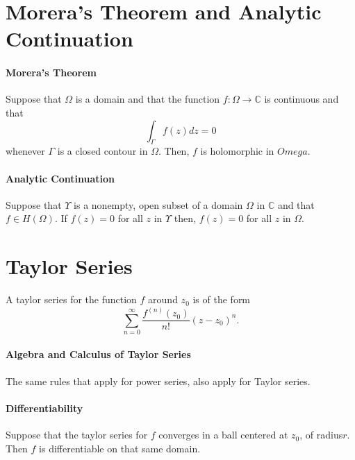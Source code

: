 \documentclass[12pt, letterpaper]{article}
\begin{document}

    \section{Morera's Theorem and Analytic Continuation}

    \paragraph{Morera's Theorem}
    Suppose that \(\Omega\) is a domain and that the function
    \(f: \Omega \to \mathbb{C}\) is continuous and that 
    \[ \int_\Gamma f(z) dz = 0\]
    whenever \(\Gamma\) is a closed contour in \(\Omega.\) Then,
    \(f\) is holomorphic in \(Omega\).

    \paragraph{Analytic Continuation}
    Suppose that \(\Upsilon\) is a nonempty, open subset of a domain 
    \(\Omega\) in \(\mathbb{C}\) and that \(f\in H(\Omega)\).
    If \(f(z) = 0\) for all \(z\) in \(\Upsilon\) then, \(f(z) = 0\) for 
    all \(z\) in \(\Omega\).


    \section{Taylor Series}
    A taylor series for the function \(f\) around \(z_0\) is of the form
    \[\sum_{n=0}^{\infty} \frac{f^{(n)}(z_0)}{n!} (z-z_0)^n.\]
    
    \paragraph{Algebra and Calculus of Taylor Series}
    The same rules that apply for power series, also apply for Taylor series.

    \paragraph{Differentiability}
    Suppose that the taylor series for \(f\) converges in a ball centered at
    \(z_0\), of radius\(r\). Then \(f\) is differentiable on that same
    domain.
\end{document}
